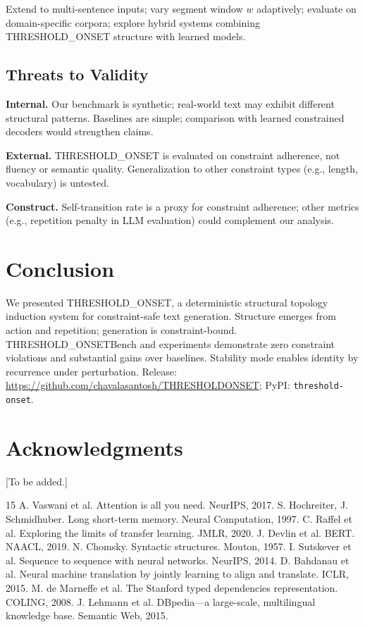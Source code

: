 \documentclass[10pt]{article}
\begin{document}
Extend to multi-sentence inputs; vary segment window $w$ adaptively; evaluate on domain-specific corpora; explore hybrid systems combining THRESHOLD\_ONSET structure with learned models.

\subsection{Threats to Validity}

\textbf{Internal.} Our benchmark is synthetic; real-world text may exhibit different structural patterns. Baselines are simple; comparison with learned constrained decoders would strengthen claims.

\textbf{External.} THRESHOLD\_ONSET is evaluated on constraint adherence, not fluency or semantic quality. Generalization to other constraint types (e.g., length, vocabulary) is untested.

\textbf{Construct.} Self-transition rate is a proxy for constraint adherence; other metrics (e.g., repetition penalty in LLM evaluation) could complement our analysis.

\section{Conclusion}
\label{sec:conclusion}

We presented THRESHOLD\_ONSET, a deterministic structural topology induction system for constraint-safe text generation. Structure emerges from action and repetition; generation is constraint-bound. THRESHOLD\_ONSETBench and experiments demonstrate zero constraint violations and substantial gains over baselines. Stability mode enables identity by recurrence under perturbation. Release: \url{https://github.com/chavalasantosh/THRESHOLDONSET}; PyPI: \texttt{threshold-onset}.

\section*{Acknowledgments}
[To be added.]



\begin{thebibliography}{15}
 A. Vaswani et al. Attention is all you need. NeurIPS, 2017.
 S. Hochreiter, J. Schmidhuber. Long short-term memory. Neural Computation, 1997.
 C. Raffel et al. Exploring the limits of transfer learning. JMLR, 2020.
 J. Devlin et al. BERT. NAACL, 2019.
 N. Chomsky. Syntactic structures. Mouton, 1957.
 I. Sutskever et al. Sequence to sequence with neural networks. NeurIPS, 2014.
 D. Bahdanau et al. Neural machine translation by jointly learning to align and translate. ICLR, 2015.
 M. de Marneffe et al. The Stanford typed dependencies representation. COLING, 2008.
 J. Lehmann et al. DBpedia—a large-scale, multilingual knowledge base. Semantic Web, 2015.
\end{thebibliography}
\end{document}
